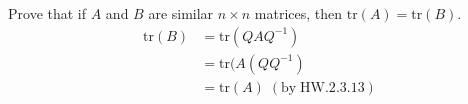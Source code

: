 Prove that if $A$ and $B$ are similar $n\times n$ matrices, then
$\text{tr}(A)= \text{tr}(B)$.
\begin{align}
\text{tr}(B) &= \text{tr}(QAQ^{-1})\\
&= \text{tr}(A(QQ^{-1})\\
&= \text{tr}(A) \; (\text{by}\; \text{HW}.2.3.13)
\end{align}
